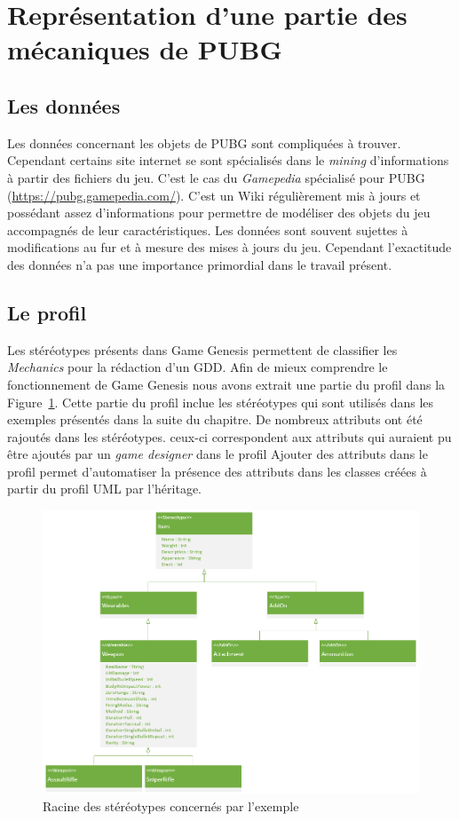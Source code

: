 \section{Représentation d'une partie des mécaniques de PUBG}
\subsection{Les données}
Les données concernant les objets de PUBG sont compliquées à trouver.
Cependant certains site internet se sont spécialisés dans le \emph{mining} d'informations à partir des fichiers du jeu.
C'est le cas du \emph{Gamepedia} spécialisé pour PUBG (\url{https://pubg.gamepedia.com/}).
C'est un Wiki régulièrement mis à jours et possédant assez d'informations pour permettre de modéliser des objets du jeu accompagnés de leur caractéristiques.
Les données sont souvent sujettes à modifications au fur et à mesure des mises à jours du jeu.
Cependant l'exactitude des données n'a pas une importance primordial dans le travail présent.


\subsection{Le profil}
Les stéréotypes présents dans Game Genesis permettent de classifier les \emph{Mechanics} pour la rédaction d'un GDD.
Afin de mieux comprendre le fonctionnement de Game Genesis nous avons extrait une partie du profil dans la Figure~\ref{fig.racine_stereo}.
Cette partie du profil inclue les stéréotypes qui sont utilisés dans les exemples présentés dans la suite du chapitre.
De nombreux attributs ont été rajoutés dans les stéréotypes. 
ceux-ci correspondent aux attributs qui auraient pu être ajoutés par un \emph{game designer} dans le profil
Ajouter des attributs dans le profil permet d'automatiser la présence des attributs dans les classes créées à partir du profil UML par l'héritage.
\begin{figure}[H]
    \centering
    \includegraphics[width=14cm]{10_img/chap6/root(stereotypes).PNG} 
    \caption{Racine des stéréotypes concernés par l'exemple}
    \label{fig.racine_stereo}
\end{figure}

